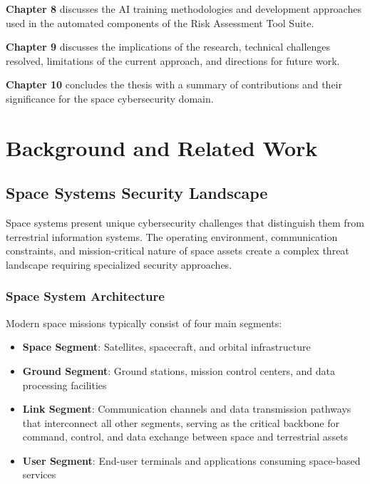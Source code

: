 \documentclass[binding=0.6cm]{sapthesis}
\begin{document}
\textbf{Chapter 8} discusses the AI training methodologies and development approaches used in the automated components of the Risk Assessment Tool Suite.

\textbf{Chapter 9} discusses the implications of the research, technical challenges resolved, limitations of the current approach, and directions for future work.

\textbf{Chapter 10} concludes the thesis with a summary of contributions and their significance for the space cybersecurity domain.

\chapter{Background and Related Work}
\label{ch:background}

\section{Space Systems Security Landscape}

Space systems present unique cybersecurity challenges that distinguish them from terrestrial information systems. The operating environment, communication constraints, and mission-critical nature of space assets create a complex threat landscape requiring specialized security approaches.

\subsection{Space System Architecture}

Modern space missions typically consist of four main segments:

\begin{itemize}
    \item \textbf{Space Segment}: Satellites, spacecraft, and orbital infrastructure
    \item \textbf{Ground Segment}: Ground stations, mission control centers, and data processing facilities
    \item \textbf{Link Segment}: Communication channels and data transmission pathways that interconnect all other segments, serving as the critical backbone for command, control, and data exchange between space and terrestrial assets
    \item \textbf{User Segment}: End-user terminals and applications consuming space-based services
\end{itemize}
\end{document}
